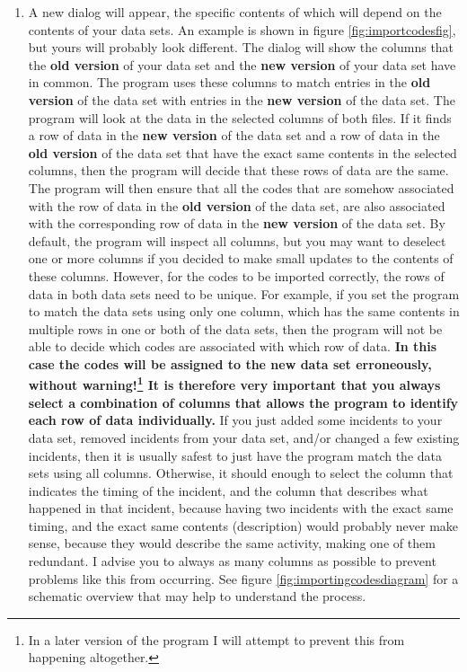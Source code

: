\documentclass{memoir}
\begin{document}
\begin{enumerate}
\item{A new dialog will appear, the specific contents of which will depend on the contents of your data sets. An example is shown in figure \ref{fig:importcodesfig}, but yours will probably look different. The dialog will show the columns that the \textbf{old version} of your data set and the \textbf{new version} of your data set have in common. The program uses these columns to match entries in the \textbf{old version} of the data set with entries in the \textbf{new version} of the data set. The program will look at the data in the selected columns of both files. If it finds a row of data in the \textbf{new version} of the data set and a row of data in the \textbf{old version} of the data set that have the exact same contents in the selected columns, then the program will decide that these rows of data are the same. The program will then ensure that all the codes that are somehow associated with the row of data in the \textbf{old version} of the data set, are also associated with the corresponding row of data in the \textbf{new version} of the data set. By default, the program will inspect all columns, but you may want to deselect one or more columns if you decided to make small updates to the contents of these columns. However, for the codes to be imported correctly, the rows of data in both data sets need to be unique. For example, if you set the program to match the data sets using only one column, which has the same contents in multiple rows in one or both of the data sets, then the program will not be able to decide which codes are associated with which row of data. \textbf{In this case the codes will be assigned to the new data set erroneously, without warning!\footnote{In a later version of the program I will attempt to prevent this from happening altogether.} It is therefore very important that you always select a combination of columns that allows the program to identify each row of data individually.} If you just added some incidents to your data set, removed  incidents from your data set, and/or changed a few existing incidents, then it is usually safest to just have the program match the data sets using all columns. Otherwise, it should enough to select the column that indicates the timing of the incident, and the column that describes what happened in that incident, because having two incidents with the exact same timing, and the exact same contents (description) would probably never make sense, because they would describe the same activity, making one of them redundant. I advise you to always as many columns as possible to prevent problems like this from occurring. See figure \ref{fig:importingcodesdiagram} for a schematic overview that may help to understand the process.}

\end{enumerate}
\end{document}
